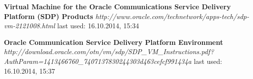 \documentclass[12pt]{article}
\begin{document}
\newpage
\printglossaries
\listoffigures
\newpage
\begin{thebibliography}{56}

   \textbf{Virtual Machine for the Oracle Communications Service 
Delivery Platform (SDP) Products}\newline
  \emph{http://www.oracle.com/technetwork/apps-tech/sdp-vm-2121008.html}
  \newline last used: 16.10.2014, 15:34


   \textbf{Oracle Communication 
Service Delivery Platform 
Environment}\newline
  \emph{http://download.oracle.com/otn/vm/sdp/SDP\_VM\_Instructions.pdf?AuthParam=1413466760\_7407137830244303d463cefcf991434a}
  \newline last used: 16.10.2014, 15:37




\end{thebibliography}
\end{document}
